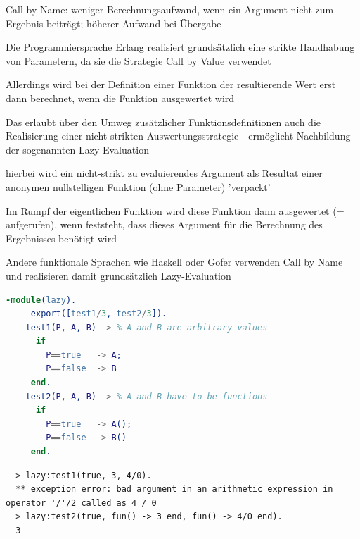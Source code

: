 \documentclass[10pt]{article}
\begin{document}
\begin{itemize*}
\begin{itemize*}
    \item Call by Name: weniger Berechnungsaufwand, wenn ein Argument nicht zum Ergebnis beiträgt; höherer Aufwand bei Übergabe
  \end{itemize*}
  \item Die Programmiersprache Erlang realisiert grundsätzlich eine strikte Handhabung von Parametern, da sie die Strategie Call by Value verwendet
  \item Allerdings wird bei der Definition einer Funktion der resultierende Wert erst dann berechnet, wenn die Funktion ausgewertet wird
  \begin{itemize*}
    \item Das erlaubt über den Umweg zusätzlicher Funktionsdefinitionen auch die Realisierung einer nicht-strikten Auswertungsstrategie - ermöglicht Nachbildung der sogenannten Lazy-Evaluation
    \item hierbei wird ein nicht-strikt zu evaluierendes Argument als Resultat einer anonymen nullstelligen Funktion (ohne Parameter) 'verpackt'
    \item Im Rumpf der eigentlichen Funktion wird diese Funktion dann ausgewertet (= aufgerufen), wenn feststeht, dass dieses Argument für die Berechnung des Ergebnisses benötigt wird
    \item Andere funktionale Sprachen wie Haskell oder Gofer verwenden Call by Name und realisieren damit grundsätzlich Lazy-Evaluation
  \end{itemize*}

  \begin{lstlisting}[language=erlang]
    -module(lazy).
    -export([test1/3, test2/3]).
    test1(P, A, B) -> % A and B are arbitrary values
      if
        P==true   -> A;
        P==false  -> B
     end.
    test2(P, A, B) -> % A and B have to be functions
      if
        P==true   -> A();
        P==false  -> B()
     end.
  \end{lstlisting}

  \begin{lstlisting}
  > lazy:test1(true, 3, 4/0).
  ** exception error: bad argument in an arithmetic expression in operator '/'/2 called as 4 / 0
  > lazy:test2(true, fun() -> 3 end, fun() -> 4/0 end).
  3
  \end{lstlisting}
  

\end{itemize*}
\end{document}
